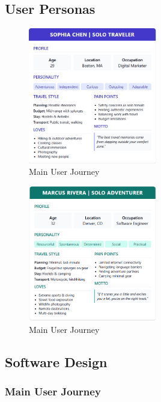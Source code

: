 \documentclass[]{project_final}
\begin{document}
\subsection{User Personas}
\begin{figure}[ht!]
    \centering
    \includegraphics[width=0.5\textwidth]{soloTrav.png}
    \vspace*{0.0cm}
    \caption{Main User Journey}
    \label{fig:1}
\end{figure}

\begin{figure}[ht!]
    \centering
    \includegraphics[width=0.5\textwidth]{soloTrav2.png}
    \vspace*{0.0cm}
    \caption{Main User Journey}
    \label{fig:1}
\end{figure}

\subsection{Software Design}
\subsubsection{Main User Journey}
\end{document}
